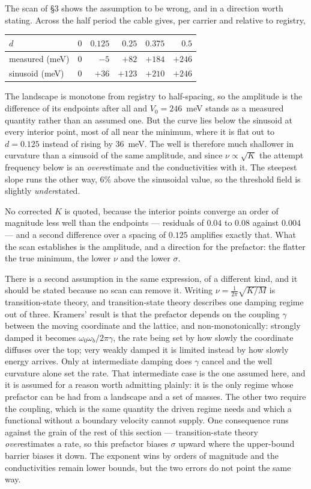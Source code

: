 \documentclass[11pt]{article}
\begin{document}
The scan of \S3 shows the assumption to be wrong, and in a direction worth stating. Across the half
period the cable gives, per carrier and relative to registry,
\begin{center}
\small
\begin{tabular}{@{}lrrrrr@{}}
\toprule
$d$ & $0$ & $0.125$ & $0.25$ & $0.375$ & $0.5$\\
\midrule
measured (meV) & $0$ & $-5$ & $+82$ & $+184$ & $+246$\\
sinusoid (meV) & $0$ & $+36$ & $+123$ & $+210$ & $+246$\\
\bottomrule
\end{tabular}
\end{center}
\noindent The landscape is monotone from registry to half-spacing, so the amplitude is the
difference of its endpoints after all and $V_0=246$~meV stands as a measured quantity rather than an
assumed one. But the curve lies below the sinusoid at every interior point, most of all near the
minimum, where it is flat out to $d=0.125$ instead of rising by $36$~meV. The well is therefore much
shallower in curvature than a sinusoid of the same amplitude, and since $\nu\propto\sqrt{K}$ the
attempt frequency below is an \emph{over}estimate and the conductivities with it. The steepest slope
runs the other way, $6\%$ above the sinusoidal value, so the threshold field is slightly
\emph{under}stated.

No corrected $K$ is quoted, because the interior points converge an order of magnitude less well
than the endpoints --- residuals of $0.04$ to $0.08$ against $0.004$ --- and a second difference over
a spacing of $0.125$ amplifies exactly that. What the scan establishes is the amplitude, and a
direction for the prefactor: the flatter the true minimum, the lower $\nu$ and the lower $\sigma$.

There is a second assumption in the same expression, of a different kind, and it should be stated
because no scan can remove it. Writing $\nu=\frac{1}{2\pi}\sqrt{K/M}$ is transition-state theory,
and transition-state theory describes one damping regime out of three. Kramers' result is that the
prefactor depends on the coupling $\gamma$ between the moving coordinate and the lattice, and
non-monotonically: strongly damped it becomes $\omega_0\omega_b/2\pi\gamma$, the rate being set by
how slowly the coordinate diffuses over the top; very weakly damped it is limited instead by how
slowly energy arrives. Only at intermediate damping does $\gamma$ cancel and the well curvature
alone set the rate. That intermediate case is the one assumed here, and it is assumed for a reason
worth admitting plainly: it is the only regime whose prefactor can be had from a landscape and a set
of masses. The other two require the coupling, which is the same quantity the driven regime needs
and which a functional without a boundary velocity cannot supply. One consequence runs against the
grain of the rest of this section --- transition-state theory \emph{over}estimates a rate, so this
prefactor biases $\sigma$ upward where the upper-bound barrier biases it down. The exponent wins by
orders of magnitude and the conductivities remain lower bounds, but the two errors do not point the
same way.
\end{document}
